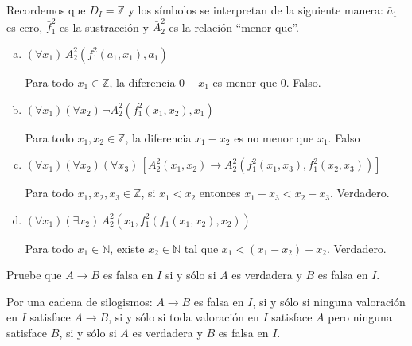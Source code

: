 \begin{remark}
Recordemos que $D_I = \mathbb Z$ y los símbolos se interpretan de la siguiente manera: $\bar a_1$ es cero, $\bar f_1^2$ es la sustracción y $\bar A_2^2$ es la relación ``menor que''.
\end{remark}

\begin{enumerate}[(a)]
    \item $(\forall x_1) \, A_2^2(f_1^2(a_1, x_1), a_1)$
    \begin{solution}
    Para todo $x_1 \in \mathbb Z$, la diferencia $0 - x_1$ es menor que $0$. Falso.
    \end{solution}
    
    \item $(\forall x_1) (\forall x_2) \, \neg A_2^2(f_1^2(x_1, x_2), x_1)$
    \begin{solution}
    Para todo $x_1, x_2 \in \mathbb Z$, la diferencia $x_1 - x_2$ es no menor que $x_1$. Falso
    \end{solution}
    
    \item $(\forall x_1) (\forall x_2) (\forall x_3) \, [A_2^2(x_1, x_2) \to A_2^2(f_1^2(x_1, x_3), f_1^2(x_2, x_3))]$
    \begin{solution}
    Para todo $x_1, x_2, x_3 \in \mathbb Z$, si $x_1 < x_2$ entonces $x_1 - x_3 < x_2 - x_3$. Verdadero.
    \end{solution}
    
    \item $(\forall x_1) (\exists x_2) \, A_2^2(x_1, f_1^2(f_1(x_1, x_2), x_2))$
    \begin{solution}
    Para todo $x_1 \in \mathbb N$, existe $x_2 \in \mathbb N$ tal que $x_1 < (x_1 - x_2) - x_2$. Verdadero.
    \end{solution}
\end{enumerate}

\begin{exercise}
Pruebe que $A \to B$ es falsa en $I$ si y sólo si $A$ es verdadera y $B$ es falsa en $I$.
\end{exercise}

\begin{solution}
Por una cadena de silogismos: $A \to B$ es falsa en $I$, si y sólo si ninguna valoración en $I$ satisface $A \to B$, si y sólo si toda valoración en $I$ satisface $A$ pero ninguna satisface $B$, si y sólo si $A$ es verdadera y $B$ es falsa en $I$.
\end{solution}
